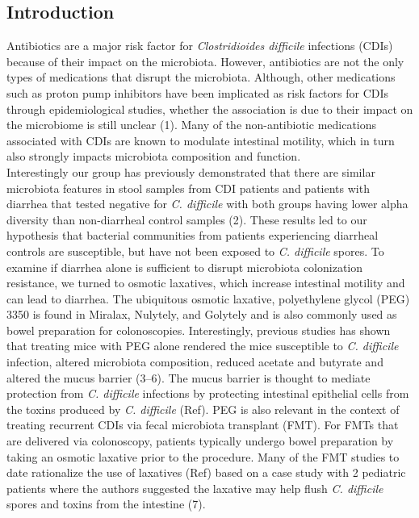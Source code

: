 \documentclass[
  11pt,
]{article}
\begin{document}
\newpage

\hypertarget{introduction}{%
\subsection{Introduction}\label{introduction}}

Antibiotics are a major risk factor for \emph{Clostridioides difficile}
infections (CDIs) because of their impact on the microbiota. However,
antibiotics are not the only types of medications that disrupt the
microbiota. Although, other medications such as proton pump inhibitors
have been implicated as risk factors for CDIs through epidemiological
studies, whether the association is due to their impact on the
microbiome is still unclear (1). Many of the non-antibiotic medications
associated with CDIs are known to modulate intestinal motility, which in
turn also strongly impacts microbiota composition and function.\\
Interestingly our group has previously demonstrated that there are
similar microbiota features in stool samples from CDI patients and
patients with diarrhea that tested negative for \emph{C. difficile} with
both groups having lower alpha diversity than non-diarrheal control
samples (2). These results led to our hypothesis that bacterial
communities from patients experiencing diarrheal controls are
susceptible, but have not been exposed to \emph{C. difficile} spores. To
examine if diarrhea alone is sufficient to disrupt microbiota
colonization resistance, we turned to osmotic laxatives, which increase
intestinal motility and can lead to diarrhea. The ubiquitous osmotic
laxative, polyethylene glycol (PEG) 3350 is found in Miralax, Nulytely,
and Golytely and is also commonly used as bowel preparation for
colonoscopies. Interestingly, previous studies has shown that treating
mice with PEG alone rendered the mice susceptible to \emph{C. difficile
}infection, altered microbiota composition, reduced acetate and butyrate
and altered the mucus barrier (3--6). The mucus barrier is thought to
mediate protection from \emph{C. difficile} infections by protecting
intestinal epithelial cells from the toxins produced by \emph{C.
difficile} (Ref). PEG is also relevant in the context of treating
recurrent CDIs via fecal microbiota transplant (FMT). For FMTs that are
delivered via colonoscopy, patients typically undergo bowel preparation
by taking an osmotic laxative prior to the procedure. Many of the FMT
studies to date rationalize the use of laxatives (Ref) based on a case
study with 2 pediatric patients where the authors suggested the laxative
may help flush \emph{C. difficile} spores and toxins from the intestine
(7).
\end{document}
